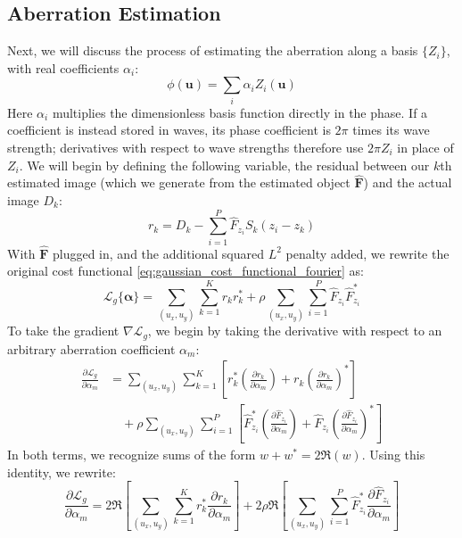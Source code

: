 \documentclass{article}
\begin{document}
\subsection{Aberration Estimation}
Next, we will discuss the process of estimating the aberration along a basis $\{Z_i\}$, with real coefficients $\alpha_i$:
\begin{equation}
\phi(\mathbf{u}) = \sum_i \alpha_i Z_i(\mathbf{u})
\end{equation}
Here $\alpha_i$ multiplies the dimensionless basis function directly in the phase. If a coefficient is instead stored in waves, its phase coefficient is $2\pi$ times its wave strength; derivatives with respect to wave strengths therefore use $2\pi Z_i$ in place of $Z_i$.
We will begin by defining the following variable, the residual between our $k$th estimated image (which we generate from the estimated object $\hat{\mathbf{F}}$) and the actual image $D_k$:
\begin{equation}
r_k = D_k - \sum_{i=1}^P \hat{F}_{z_i} S_{k}(z_i - z_k)
\end{equation}
With $\hat{\mathbf{F}}$ plugged in, and the additional squared $L^2$ penalty added, we rewrite the original cost functional \autoref{eq:gaussian_cost_functional_fourier} as:
\begin{equation}
\mathcal{L}_g \{\bm{\alpha}\} = \sum_{(u_x, u_y)} \sum_{k=1}^K r_k r_k^*  + \rho \sum_{(u_x, u_y)} \sum_{i=1}^P \hat{F}_{z_i} \hat{F}^*_{z_i}
\end{equation}
To take the gradient $\nabla \mathcal{L}_g$, we begin by taking the derivative with respect to an arbitrary aberration coefficient $\alpha_m$:
\begin{align}
\frac{\partial \mathcal{L}_g}{\partial \alpha_m} &= \sum_{(u_x, u_y)} \sum_{k=1}^K \left[r_k^* \left(\frac{\partial r_k}{\partial \alpha_m} \right)  + r_k \left(\frac{\partial r_k}{\partial \alpha_m} \right)^*\right] \nonumber\\
&\quad + \rho \sum_{(u_x, u_y)} \sum_{i=1}^P \left[\hat{F}_{z_i}^* \left(\frac{\partial \hat{F}_{z_i}}{\partial \alpha_m} \right)  + \hat{F}_{z_i} \left(\frac{\partial \hat{F}_{z_i}}{\partial \alpha_m} \right)^*\right]
\end{align}
In both terms, we recognize sums of the form $w + w^* = 2 \Re(w)$. Using this identity, we rewrite:
\begin{equation}
\frac{\partial \mathcal{L}_g}{\partial \alpha_m} = 2 \Re \left[\sum_{(u_x, u_y)} \sum_{k=1}^K r_k^* \frac{\partial r_k}{\partial \alpha_m} \right] + 2 \rho \Re \left[\sum_{(u_x, u_y)} \sum_{i=1}^P \hat{F}_{z_i}^* \frac{\partial \hat{F}_{z_i}}{\partial \alpha_m} \right]
\end{equation}
\end{document}
